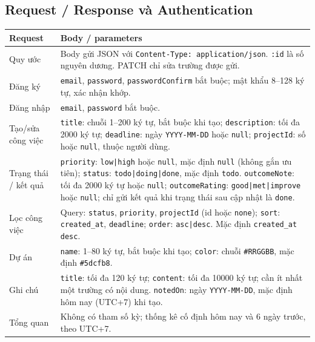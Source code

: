 \subsection{Request / Response và Authentication}
\begingroup
\small
\begin{longtable}{@{}P{.21\linewidth}P{.70\linewidth}@{}}
\toprule
\textbf{Request} & \textbf{Body / parameters} \\
\midrule
\endhead
Quy ước & Body gửi JSON với \texttt{Content-Type: application/json}. \texttt{:id} là số nguyên dương. PATCH chỉ sửa trường được gửi. \\
Đăng ký & \texttt{email}, \texttt{password}, \texttt{passwordConfirm} bắt buộc; mật khẩu 8--128 ký tự, xác nhận khớp. \\
Đăng nhập & \texttt{email}, \texttt{password} bắt buộc. \\
Tạo/sửa công việc & \texttt{title}: chuỗi 1--200 ký tự, bắt buộc khi tạo; \texttt{description}: tối đa 2000 ký tự; \texttt{deadline}: ngày \texttt{YYYY-MM-DD} hoặc \texttt{null}; \texttt{projectId}: số hoặc \texttt{null}, thuộc người dùng. \\
Trạng thái / kết quả & \texttt{priority}: \texttt{low|high} hoặc \texttt{null}, mặc định \texttt{null} (không gắn ưu tiên); \texttt{status}: \texttt{todo|doing|done}, mặc định \texttt{todo}. \texttt{outcomeNote}: tối đa 2000 ký tự hoặc \texttt{null}; \texttt{outcomeRating}: \texttt{good|met|improve} hoặc \texttt{null}; chỉ gửi kết quả khi trạng thái sau cập nhật là \texttt{done}. \\
Lọc công việc & Query: \texttt{status}, \texttt{priority}, \texttt{projectId} (id hoặc \texttt{none}); \texttt{sort}: \texttt{created\_at}, \texttt{deadline}; \texttt{order}: \texttt{asc|desc}. Mặc định \texttt{created\_at desc}. \\
Dự án & \texttt{name}: 1--80 ký tự, bắt buộc khi tạo; \texttt{color}: chuỗi \texttt{\#RRGGBB}, mặc định \texttt{\#5dcfb8}. \\
Ghi chú & \texttt{title}: tối đa 120 ký tự; \texttt{content}: tối đa 10000 ký tự; cần ít nhất một trường có nội dung. \texttt{notedOn}: ngày \texttt{YYYY-MM-DD}, mặc định hôm nay (UTC+7) khi tạo. \\
Tổng quan & Không có tham số kỳ; thống kê cố định hôm nay và 6 ngày trước, theo UTC+7. \\
\bottomrule
\end{longtable}

